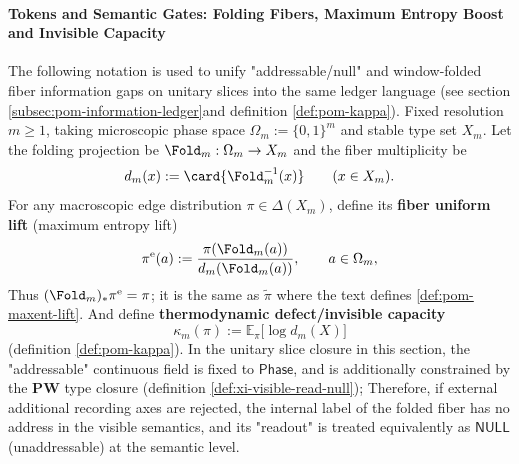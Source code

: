 

\paragraph{Tokens and Semantic Gates: Folding Fibers, Maximum Entropy Boost and Invisible Capacity}\label{par:xi-null-notation-semantic-gate}
The following notation is used to unify "addressable/null" and window-folded fiber information gaps on unitary slices into the same ledger language (see section \ref{subsec:pom-information-ledger} ​​and definition \ref{def:pom-kappa}).
Fixed resolution \(m\ge 1\), taking microscopic phase space \(\Omega_m:=\{0,1\}^m\) and stable type set \(X_m\).
Let the folding projection be \(\Fold_m:\Omega_m\to X_m\) ​​and the fiber multiplicity be
\[
d_m(x):=\card{\Fold_m^{-1}(x)}\qquad(x\in X_m).
\]
For any macroscopic edge distribution \(\pi\in\Delta(X_m)\), define its \textbf{fiber uniform lift} (maximum entropy lift)
\begin{equation}\label{eq:xi-null-maxent-lift}
\pi^{\mathrm{e}}(a):=\frac{\pi(\Fold_m(a))}{d_m(\Fold_m(a))},\qquad a\in\Omega_m,
\end{equation}
Thus \((\Fold_m)_*\pi^{\mathrm{e}}=\pi\); it is the same as \(\widetilde\pi\) where the text defines \ref{def:pom-maxent-lift}.
And define \textbf{thermodynamic defect/invisible capacity}
\[
\kappa_m(\pi):=\mathbb{E}_{\pi}\bigl[\log d_m(X)\bigr]
\]
(definition \ref{def:pom-kappa}).
In the unitary slice closure in this section, the "addressable" continuous field is fixed to \(\mathsf{Phase}\), and is additionally constrained by the \(\mathbf{PW}\) type closure (definition \ref{def:xi-visible-read-null});
Therefore, if external additional recording axes are rejected, the internal label of the folded fiber has no address in the visible semantics, and its "readout" is treated equivalently as \(\mathsf{NULL}\) ​​(unaddressable) at the semantic level.

